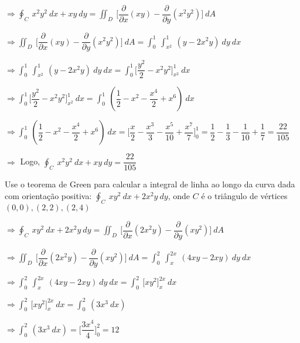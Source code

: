 \documentclass[11pt,a4paper]{article}
\begin{document}
\begin{enumerate}
{		$\Rightarrow \displaystyle\oint_C\ x^2y^2\ dx + xy\ dy = \displaystyle\iint_D\ \Bigg[\dfrac{\partial}{\partial x}(xy) - \dfrac{\partial}{\partial y}(x^2y^2)\Bigg]\ dA $
		
		$\Rightarrow \displaystyle\iint_D\ \Bigg[\dfrac{\partial}{\partial x}(xy) - \dfrac{\partial}{\partial y}(x^2y^2)\Bigg]\ dA = \displaystyle\int_{0}^{1}\ \displaystyle\int_{x^2}^{1}\ (y - 2x^2y)\ dy\ dx$
		
		$\Rightarrow \displaystyle\int_{0}^{1}\ \displaystyle\int_{x^2}^{1}\ (y - 2x^2y)\ dy\ dx = \displaystyle\int_{0}^{1}\Bigg[\dfrac{y^2}{2} - x^2y^2\Bigg]_{x^2}^1\ dx$
		
		$\Rightarrow \displaystyle\int_{0}^{1}\Bigg[\dfrac{y^2}{2} - x^2y^2\Bigg]_{x^2}^1\ dx = \displaystyle\int_{0}^{1}\ (\dfrac{1}{2} - x^2 - \dfrac{x^4}{2} + x^6)\ dx$
		
		$\Rightarrow \displaystyle\int_{0}^{1}\ (\dfrac{1}{2} - x^2 - \dfrac{x^4}{2} + x^6)\ dx = \Bigg[\dfrac{x}{2} - \dfrac{x^3}{3} - \dfrac{x^5}{10} + \dfrac{x^7}{7}\Bigg]_0^1 = \dfrac{1}{2} - \dfrac{1}{3} - \dfrac{1}{10} + \dfrac{1}{7} = \dfrac{22}{105}$
		
		$\Rightarrow$ Logo, $\displaystyle\oint_C\ x^2y^2\ dx + xy\ dy = \dfrac{22}{105}$
		\item Use o teorema de Green para calcular a integral de linha ao longo da curva dada com orientação positiva: $\displaystyle\oint_C\ xy^2\ dx + 2x^2y\ dy$, onde $C$ é o triângulo de vértices $(0,0),(2,2),(2,4)$
		
		$\Rightarrow \displaystyle\oint_C\ xy^2\ dx + 2x^2y\ dy = \displaystyle\iint_D\ \Bigg[\dfrac{\partial}{\partial x}(2x^2y) - \dfrac{\partial}{\partial y}(xy^2)\Bigg]\ dA $
		
		$\Rightarrow \displaystyle\iint_D\ \Bigg[\dfrac{\partial}{\partial x}(2x^2y) - \dfrac{\partial}{\partial y}(xy^2)\Bigg]\ dA = \displaystyle\int_{0}^{2}\ \displaystyle\int_{x}^{2x}\ (4xy - 2xy)\ dy\ dx$
		
		$\Rightarrow \displaystyle\int_{0}^{2}\ \displaystyle\int_{x}^{2x}\ (4xy - 2xy)\ dy\ dx = \displaystyle\int_{0}^{2}\ \Big[xy^2\Big]_x^{2x}\ dx$
		
		$\Rightarrow \displaystyle\int_{0}^{2}\ \Big[xy^2\Big]_x^{2x}\ dx = \displaystyle\int_{0}^{2}\ (3x^3\ dx)$
		
		$\Rightarrow \displaystyle\int_{0}^{2}\ (3x^3\ dx) = \Big[\dfrac{3x^4}{4}\Big]_0^2 = 12$
		
}
\end{enumerate}
\end{document}
